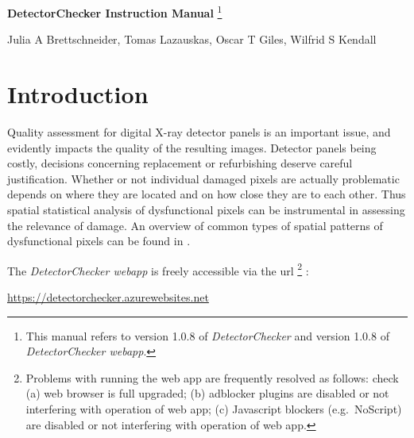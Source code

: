 \documentclass[11pt,a4paper]{article}
\newcommand{\DetectorChecker}{\emph{DetectorChecker}\xspace}
\newcommand{\DetectorCheckerWebApp}{\emph{DetectorChecker webapp}\xspace}
\begin{document}


\begin{center}

{\LARGE\bf DetectorChecker Instruction Manual}
\footnote{This manual refers to version 1.0.8 of \DetectorChecker and version 1.0.8 of \DetectorCheckerWebApp.}


\bigskip
{\large Julia A Brettschneider, Tomas Lazauskas, Oscar T Giles, Wilfrid S Kendall}

\end{center}




\section{Introduction}\label{int}

Quality assessment for digital X-ray detector panels is an important issue, and evidently
impacts the quality of the resulting images. 
Detector panels being costly, 
decisions concerning replacement or refurbishing 
deserve careful justification.
Whether or not individual damaged pixels are actually 
problematic depends on where they are located and 
on how close they are to each other.
Thus spatial statistical analysis of dysfunctional pixels can be 
instrumental in assessing the relevance of damage.
An overview of common types of spatial patterns of dysfunctional pixels can be found in \cite{brettschneider2014crism}. 

The \DetectorCheckerWebApp is freely accessible via the url \footnote{
	Problems with running the web app are frequently resolved as follows: check (a) web browser is full upgraded; (b) adblocker plugins are disabled or not interfering with operation of web app; (c) Javascript blockers (e.g.~NoScript) are disabled or not interfering with operation of web app.}
:

\begin{mdframed}
	\bigskip
	\centerline{
		{\large
			\url{https://detectorchecker.azurewebsites.net}
		}
	}
	\medskip
\end{mdframed}
\end{document}
